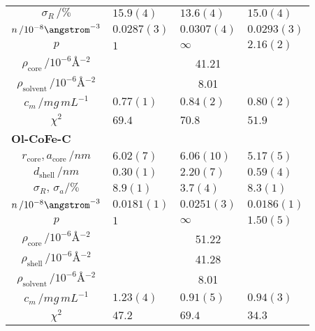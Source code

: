 \documentclass[\main/dresen_thesis.tex]{subfiles}
\begin{document}
\begin{table}[ht]
\begin{tabular}{ c | l | l | l }
        \rule{0pt}{2ex} $\sigma_R \, / \unit{\%}$                     & $15.9(4)$      & $13.6(4)$  & $15.0(4)$\\
        \rule{0pt}{2ex} $n \, / 10^{-8} \angstrom^{-3}$               & $0.0287(3)$    & $0.0307(4)$& $0.0293(3)$\\
        \rule{0pt}{2ex} $p$                                           & $1$            & $\infty$   & $2.16(2)$\\
        \hline
        \rule{0pt}{2ex} $\rho_\mathrm{core}    \, / \unit{10^{-6} \angstrom^{-2}}$     & \multicolumn{3}{c}{41.21}\\
        \rule{0pt}{2ex} $\rho_\mathrm{solvent} \, / \unit{10^{-6} \angstrom^{-2}}$     & \multicolumn{3}{c}{8.01}\\
        \hline
        \rule{0pt}{2ex} $c_m \, / \unit{mg\, mL^{-1}}$                & $0.77(1)$      & $0.84(2)$  & $0.80(2)$\\
        \hline
        \rule{0pt}{2ex} $\chi^2$                                      & $69.4$         & $70.8$     & $51.9$\\
        \hline
        \hline
        \multicolumn{4}{l}{\textbf{Ol-CoFe-C}}\\
        \hline
        \rule{0pt}{2ex} $r_\mathrm{core}, a_\mathrm{core} \, / \unit{nm}$    & $6.02(7)$     & $6.06(10)$   & $5.17(5)$\\
        \rule{0pt}{2ex} $d_\mathrm{shell} \, / \unit{nm}$                    & $0.30(1)$     & $2.20(7)$    & $0.59(4)$\\
        \rule{0pt}{2ex} $\sigma_R , \, \sigma_a / \unit{\%}$                 & $8.9(1)$      & $3.7(4)$     & $8.3(1)$\\
        \rule{0pt}{2ex} $n \, / 10^{-8} \angstrom^{-3}$                      & $0.0181(1)$   & $0.0251(3)$  & $0.0186(1)$\\
        \rule{0pt}{2ex} $p$                                                  & $1$           & $\infty$     & $1.50(5)$\\
        \hline
        \rule{0pt}{2ex} $\rho_\mathrm{core}    \, / \unit{10^{-6} \angstrom^{-2}}$     & \multicolumn{3}{c}{51.22}\\
        \rule{0pt}{2ex} $\rho_\mathrm{shell}    \, / \unit{10^{-6} \angstrom^{-2}}$    & \multicolumn{3}{c}{41.28}\\
        \rule{0pt}{2ex} $\rho_\mathrm{solvent} \, / \unit{10^{-6} \angstrom^{-2}}$     & \multicolumn{3}{c}{8.01}\\
        \hline
        \rule{0pt}{2ex} $c_m \, / \unit{mg\, mL^{-1}}$                & $1.23(4)$      & $0.91(5)$  & $0.94(3)$\\
        \hline
        \rule{0pt}{2ex} $\chi^2$                            & $47.2$        & $69.4$       & $34.3$\\
        \hline
      \end{tabular}
    \end{table}
\end{document}
